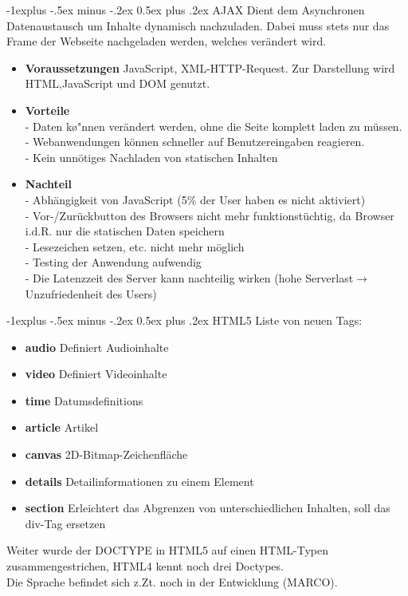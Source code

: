 \documentclass[10pt,landscape]{article}
\makeatletter
\renewcommand{\subsection}{\@startsection{subsection}{2}{0mm}%
                                {-1explus -.5ex minus -.2ex}%
                                {0.5ex plus .2ex}%
                                {\normalfont\normalsize\bfseries}}
\makeatother
\begin{document}
\begin{multicols}{3}
\subsection{AJAX}
Dient dem Asynchronen Datenaustausch um Inhalte dynamisch nachzuladen. Dabei muss stets nur das Frame der Webseite nachgeladen werden, welches ver\"andert wird.\\
\begin{itemize}
    \item \textbf{Voraussetzungen} JavaScript, XML-HTTP-Request. Zur Darstellung wird HTML,JavaScript und DOM genutzt.
    \item \textbf{Vorteile} \\
    - Daten k\o"nnen ver\"andert werden, ohne die Seite komplett laden zu m\"ussen.\\
    - Webanwendungen k\"onnen schneller auf Benutzereingaben reagieren.\\
    - Kein unn\"otiges Nachladen von statischen Inhalten
    \item \textbf{Nachteil}\\
    - Abh\"angigkeit von JavaScript (5\% der User haben es nicht aktiviert)\\
    - Vor-/Zur\"uckbutton des Browsers nicht mehr funktionst\"uchtig, da Browser i.d.R. nur die statischen Daten speichern\\
    - Lesezeichen setzen, etc. nicht mehr m\"oglich\\
    - Testing der Anwendung aufwendig\\
    - Die Latenzzeit des Server kann nachteilig wirken (hohe Serverlast$\rightarrow$Unzufriedenheit des Users)
\end{itemize}

\subsection{HTML5}
Liste von neuen Tags:
\begin{itemize}
    \item \textbf{audio} Definiert Audioinhalte
    \item \textbf{video} Definiert Videoinhalte
    \item \textbf{time} Datumsdefinitions
    \item \textbf{article} Artikel
    \item \textbf{canvas}  2D-Bitmap-Zeichenfl\"ache
    \item \textbf{details} Detailinformationen zu einem Element
    \item \textbf{section} Erleichtert das Abgrenzen von unterschiedlichen Inhalten, soll das div-Tag ersetzen
\end{itemize}
Weiter wurde der DOCTYPE in HTML5 auf einen HTML-Typen zusammengestrichen, HTML4 kennt noch drei Doctypes.\\
Die Sprache befindet sich z.Zt. noch in der Entwicklung (MARCO).


\end{multicols}
\end{document}

